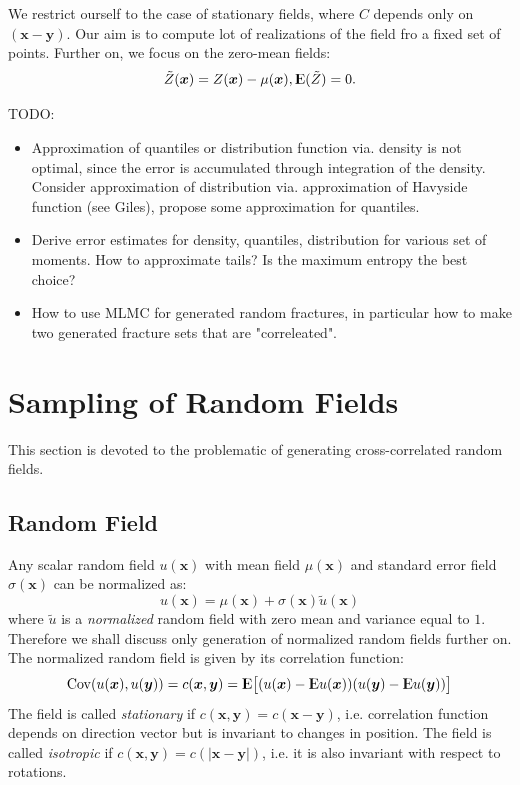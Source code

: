 \documentclass{article}
\def\vc#1{\mathbf{\boldsymbol{#1}}}     %
\def \E{{{\rm I\kern-.3em E}}}
\begin{document}
We restrict ourself to the case of stationary fields, where $C$ depends only on $(\vc x - \vc y)$. Our aim is to compute lot of realizations of the field fro a fixed set of points. Further on, we focus on the zero-mean fields:
\[
    \tilde Z(\vc x) = Z(\vc x) - \mu(\vc x), \E(\tilde Z) = 0.
\]

TODO:
\begin{itemize}
\item Approximation of quantiles or distribution function via. density is not optimal, since the error is accumulated through integration of the density. Consider approximation of distribution via. approximation of Havyside function (see Giles), propose some approximation for quantiles.

\item Derive error estimates for density, quantiles, distribution  for various set of moments. How to approximate tails? Is the maximum entropy the best choice?

\item How to use MLMC for generated random fractures, in particular how to make two generated fracture sets that are "correleated".
\end{itemize}

\section{Sampling  of Random Fields}
This section is devoted to the problematic of generating cross-correlated random fields.

\subsection{Random Field}
Any scalar random field $u(\vc x)$ with mean field $\mu(\vc x)$ and standard error
field $\sigma(\vc x)$ can be normalized as:
\[
    u(\vc x) = \mu(\vc x) + \sigma(\vc x) \tilde{u}(\vc x)
\]
where $\tilde{u}$ is a \emph{normalized} random field with zero mean and variance equal to $1$. Therefore we shall discuss only generation of normalized random fields further on. The normalized random field is given by its correlation function:
\[
    {\rm Cov}(u(\vc x), u(\vc y) ) = c(\vc x, \vc y)  
    = \E\big[ (u(\vc x) - \E u(\vc x))(u(\vc y) - \E u(\vc y)) \big]
\]
The field is called \emph{stationary} if $c(\vc x, \vc y) = c(\vc x - \vc y)$, i.e. 
correlation function depends on direction vector but is invariant to changes in position. The field is called \emph{isotropic} if $c(\vc x, \vc y) = c(|\vc x - \vc y|)$, i.e. it is also invariant with respect to rotations. 
\end{document}
